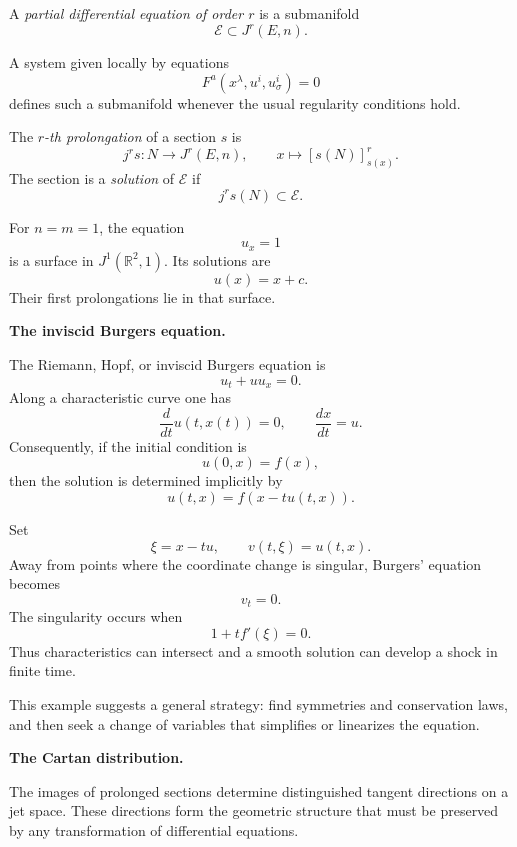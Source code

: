 \begin{definition}
\label{definition-pde-jet-space}
A \textit{partial differential equation of
order $r$} is a submanifold
$$
\mathcal{E}\subset J^r(E,n).
$$
\end{definition}

A system given locally by equations
$$
F^a(x^\lambda,u^i,u^i_\sigma)=0
$$
defines such a submanifold whenever the
usual regularity conditions hold.

\begin{definition}
\label{definition-prolongation-section}
The \textit{$r$-th prolongation} of a
section $s$ is
$$
j^rs:N\longrightarrow J^r(E,n),
\qquad x\longmapsto[s(N)]^r_{s(x)}.
$$
The section is a \textit{solution} of
$\mathcal{E}$ if
$$
j^rs(N)\subset\mathcal{E}.
$$
\end{definition}

\begin{example}
\label{example-first-derivative-one}
For $n=m=1$, the equation
$$
u_x=1
$$
is a surface in $J^1(\mathbb{R}^2,1)$.
Its solutions are
$$
u(x)=x+c.
$$
Their first prolongations lie in that
surface.
\end{example}

\medskip\noindent
{\bf The inviscid Burgers equation.}

\begin{example}
\label{example-inviscid-burgers}
The Riemann, Hopf, or inviscid Burgers
equation is
$$
u_t+uu_x=0.
$$
Along a characteristic curve one has
$$
\frac{d}{dt}u(t,x(t))=0,
\qquad
\frac{dx}{dt}=u.
$$
Consequently, if the initial condition is
$$
u(0,x)=f(x),
$$
then the solution is determined implicitly
by
$$
u(t,x)=f(x-tu(t,x)).
$$

Set
$$
\xi=x-tu,
\qquad
v(t,\xi)=u(t,x).
$$
Away from points where the coordinate
change is singular, Burgers' equation
becomes
$$
v_t=0.
$$
The singularity occurs when
$$
1+tf'(\xi)=0.
$$
Thus characteristics can intersect and a
smooth solution can develop a shock in
finite time.
\end{example}

This example suggests a general strategy:
find symmetries and conservation laws, and
then seek a change of variables that
simplifies or linearizes the equation.

\medskip\noindent
{\bf The Cartan distribution.}

The images of prolonged sections determine
distinguished tangent directions on a jet
space. These directions form the geometric
structure that must be preserved by any
transformation of differential equations.

